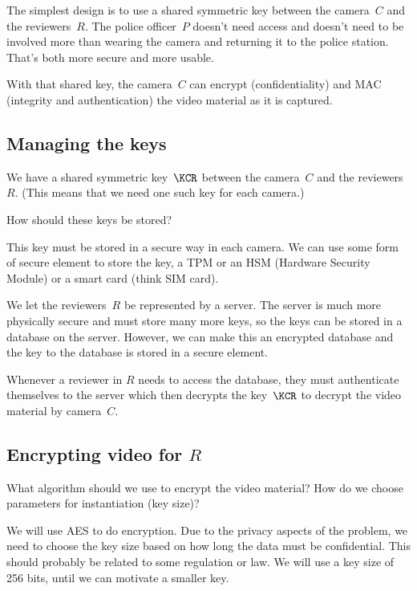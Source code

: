 The simplest design is to use a shared symmetric key between the camera~\(C\) 
and the reviewers~\(R\).
The police officer~\(P\) doesn't need access and doesn't need to be involved 
more than wearing the camera and returning it to the police station.
That's both more secure and more usable.

With that shared key, the camera~\(C\) can encrypt (confidentiality) and MAC 
(integrity and authentication) the video material as it is captured.

\subsection{Managing the keys}

We have a shared symmetric key~\(\KCR\) between the camera~\(C\) and the 
reviewers~\(R\).
(This means that we need one such key for each camera.)

\begin{exercise}
  How should these keys be stored?
\end{exercise}

This key must be stored in a secure way in each camera.
We can use some form of secure element to store the key, \eg a \ac{TPM} or
an HSM (Hardware Security Module) or a smart card (think SIM card).

We let the reviewers~\(R\) be represented by a server.
The server is much more physically secure and must store many more keys,
so the keys can be stored in a database on the server.
However, we can make this an encrypted database and the key to the database is 
stored in a secure element.

Whenever a reviewer in \(R\) needs to access the database, they must 
authenticate themselves to the server which then decrypts the key~\(\KCR\) to 
decrypt the video material by camera~\(C\).

\subsection{Encrypting video for \texorpdfstring{\(R\)}{R}}

\begin{exercise}
  What algorithm should we use to encrypt the video material?
  How do we choose parameters for instantiation (\eg key size)?
\end{exercise}

We will use \ac{AES} to do encryption.
Due to the privacy aspects of the problem, we need to choose the key size based 
on how long the data must be confidential.
This should probably be related to some regulation or law.
We will use a key size of 256 bits, until we can motivate a smaller key.

